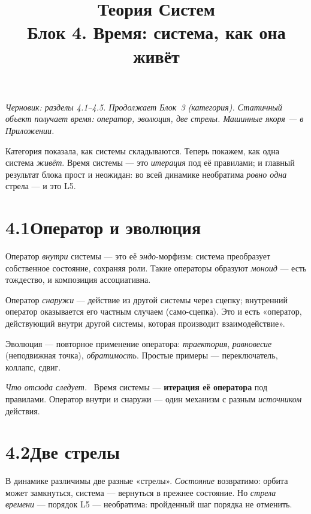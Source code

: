\documentclass[12pt,a4paper]{article}
\title{\textbf{Теория Систем}\\[2mm]\large Блок 4. Время: система, как она живёт}
\author{}
\date{}
\newcommand{\rezultat}{\medskip\noindent\emph{Что отсюда следует.}\ }
\begin{document}
\maketitle
\thispagestyle{empty}

\noindent\small\textit{Черновик: разделы 4.1--4.5. Продолжает Блок~3 (категория). Статичный объект
получает время: оператор, эволюция, две стрелы. Машинные якоря --- в Приложении.}\normalsize

\bigskip

\noindent Категория показала, как системы складываются. Теперь покажем, как одна система
\emph{живёт}. Время системы --- это \emph{итерация} под её правилами; и главный результат блока
прост и неожидан: во всей динамике необратима \emph{ровно одна} стрела --- и это L5.

\section*{4.1\quad Оператор и эволюция}

Оператор \emph{внутри} системы --- это её \emph{эндо}-морфизм: система преобразует собственное
состояние, сохраняя роли. Такие операторы образуют \emph{моноид} --- есть тождество, и композиция
ассоциативна.

Оператор \emph{снаружи} --- действие из другой системы через сцепку; внутренний оператор оказывается
его частным случаем (само-сцепка). Это и есть «оператор, действующий внутри другой системы, которая
производит взаимодействие».

Эволюция --- повторное применение оператора: \emph{траектория}, \emph{равновесие} (неподвижная
точка), \emph{обратимость}. Простые примеры --- переключатель, коллапс, сдвиг.

\rezultat
Время системы --- \textbf{итерация её оператора} под правилами. Оператор внутри и снаружи --- один
механизм с разным \emph{источником} действия.

\section*{4.2\quad Две стрелы}

В динамике различимы две разные «стрелы». \emph{Состояние} возвратимо: орбита может замкнуться,
система --- вернуться в прежнее состояние. Но \emph{стрела времени} --- порядок L5 --- необратима:
пройденный шаг порядка не отменить.
\end{document}
